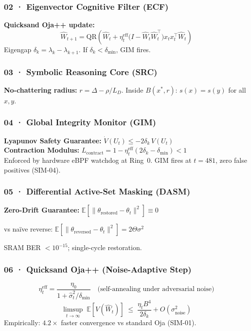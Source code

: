 \documentclass[12pt, a4paper]{article}
\begin{document}
\subsubsection{02 · Eigenvector Cognitive Filter (ECF)}
\begin{cyanbox}
\textbf{Quicksand Oja++ update:}
$$
\hat{W}_{t+1} = \mathrm{QR}\!\left(\hat{W}_t + \eta_t^{\text{eff}} \bigl(I - \hat{W}_t \hat{W}_t^\top\bigr) x_t x_t^\top \hat{W}_t\right)
$$
Eigengap $\delta_k = \lambda_k - \lambda_{k+1}$. If $\delta_k < \delta_{\min}$, GIM fires.
\end{cyanbox}

\subsubsection{03 · Symbolic Reasoning Core (SRC)}
\begin{cyanbox}
\textbf{No-chattering radius:} $r = \Delta - \rho/L_D$. Inside $B(x^*, r)$: $s(x) = s(y)$ for all $x, y$.
\end{cyanbox}

\subsubsection{04 · Global Integrity Monitor (GIM)}
\begin{redbox}
\textbf{Lyapunov Safety Guarantee:} $\dot{V}(U_t) \leq -2\delta_k\,V(U_t)$\\
\textbf{Contraction Modulus:} $L_{\text{contract}} = 1 - \eta_t^{\text{eff}}(2\delta_k - \delta_{\min}) < 1$\\
Enforced by hardware eBPF watchdog at Ring~0. GIM fires at $t=481$, zero false positives (SIM-04).
\end{redbox}

\subsubsection{05 · Differential Active-Set Masking (DASM)}
\begin{greenbox}
\textbf{Zero-Drift Guarantee:} $\mathbb{E}\!\left[\|\theta_{\text{restored}} - \theta_t\|^2\right] \equiv 0$

vs naïve reverse: $\mathbb{E}[\|\theta_{\text{reversed}} - \theta_t\|^2] = 2\Theta\sigma^2$

SRAM BER $< 10^{-15}$; single-cycle restoration.
\end{greenbox}

\subsubsection{06 · Quicksand Oja++ (Noise-Adaptive Step)}
\begin{cyanbox}
$$
\eta_t^{\text{eff}} = \frac{\eta_0}{1 + \hat{\sigma}^2_t / \delta_{\min}} \quad \text{(self-annealing under adversarial noise)}
$$
$$
\limsup_{t\to\infty}\; \mathbb{E}[V(\hat{W}_t)] \;\leq\; \frac{\eta_t B^4}{2\delta_k} + O(\sigma^2_{\text{noise}})
$$
Empirically: $4.2\times$ faster convergence vs standard Oja (SIM-01).
\end{cyanbox}
\end{document}
